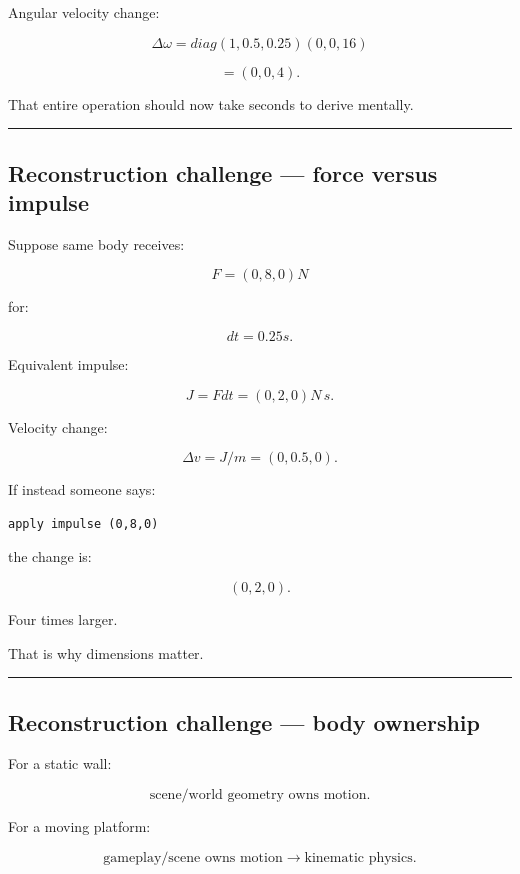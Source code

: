 Angular velocity change:

\[
\Delta\omega
=
diag(1,0.5,0.25)
(0,0,16)
\]

\[
=
(0,0,4).
\]

That entire operation should now take seconds to derive mentally.

\begin{center}\rule{0.5\linewidth}{0.5pt}\end{center}

\subsection{Reconstruction challenge --- force versus impulse}\label{06-engine-ii-ch038-reconstruction-challenge-force-versus-impulse}

Suppose same body receives:

\[
F=(0,8,0)N
\]

for:

\[
dt=0.25s.
\]

Equivalent impulse:

\[
J=Fdt
=
(0,2,0)N\,s.
\]

Velocity change:

\[
\Delta v
=
J/m
=
(0,0.5,0).
\]

If instead someone says:

\begin{verbatim}
apply impulse (0,8,0)
\end{verbatim}

the change is:

\[
(0,2,0).
\]

Four times larger.

That is why dimensions matter.

\begin{center}\rule{0.5\linewidth}{0.5pt}\end{center}

\subsection{Reconstruction challenge --- body ownership}\label{06-engine-ii-ch038-reconstruction-challenge-body-ownership}

For a static wall:

\[
\text{scene/world geometry owns motion}.
\]

For a moving platform:

\[
\text{gameplay/scene owns motion}
\rightarrow
\text{kinematic physics}.
\]


